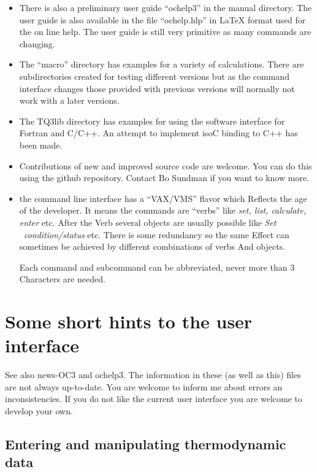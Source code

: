 \documentclass[12pt]{article}
\begin{document}
\begin{itemize}
\item There is also a preliminary user guide ``ochelp3'' in the manual
  directory.  The user guide is also available in the file
  ``ochelp.hlp'' in LaTeX format used for the on line help.  The user
  guide is still very primitive as many commands are changing.

\item The ``macro'' directory has examples for a variety of
  calculations.  There are subdirectories created for testing
  different versions but as the command interface changes those
  provided with previous versions will normally not work with a later
  versions.

\item The TQ3lib directory has examples for using the software
  interface for Fortran and C/C++.  An attempt to implement isoC
  binding to C++ has been made.

\item Contributions of new and improved source code are welcome.  You
  can do this using the github repository.  Contact Bo Sundman if you
  want to know more.

\item the command line interface has a ``VAX/VMS'' flavor which
  Reflects the age of the developer.  It means the commands are
  ``verbs'' like {\em set, list, calculate, enter} etc.  After the
  Verb several objects are usually possible like {\em
    Set ~condition/status} etc.  There is some redundancy so the same
  Effect can sometimes be achieved by different combinations of verbs
  And objects.

  Each command and subcommand can be abbreviated, never more than 3
  Characters are needed.

\end{itemize}

\section{Some short hints to the user interface}

See also news-OC3 and ochelp3.  The information in these (as well as
this) files are not always up-to-date.  You are welcome to inform me
about errors an inconsistencies.  If you do not like the current user
interface you are welcome to develop your own.

\subsection{Entering and manipulating thermodynamic data}
\end{document}
